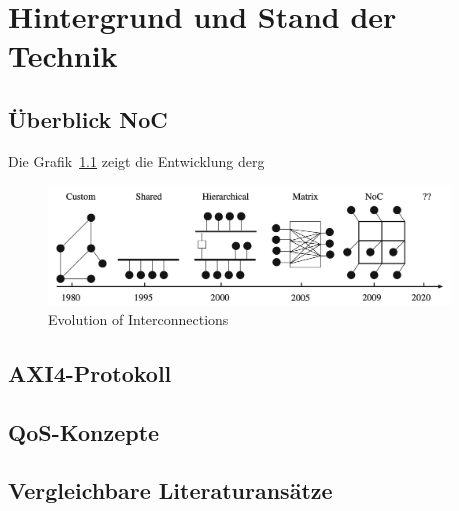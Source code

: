 \chapter{Hintergrund und Stand der Technik}

\section{Überblick NoC}
Die Grafik~\ref{fig:Evolution_of_Interconnection} zeigt die Entwicklung derg
\begin{figure}[htbp]
    \centering
    \includegraphics[width=0.95\textwidth]{img/Evolution of On-Chip communication interconnect.png}
    \caption{Evolution of Interconnections~\cite{BenAbdallah2013}}  \label{fig:Evolution_of_Interconnection}
\end{figure}


\section{AXI4-Protokoll}

\section{QoS-Konzepte}

\section{Vergleichbare Literaturansätze}
